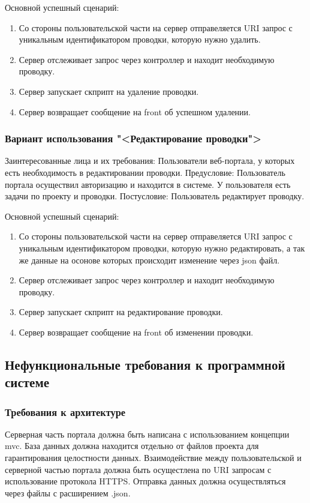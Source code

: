 Основной успешный сценарий:
\begin{enumerate}
	\item Со стороны пользовательской части на сервер отправеляется URI запрос с уникальным идентификатором проводки, которую нужно удалить.
	\item Сервер отслеживает запрос через контроллер и находит необходимую проводку.
	\item Сервер запускает скприпт на удаление проводки.
	\item Сервер возвращает сообщение на front об успешном удалении.
\end{enumerate}

\subsubsection{Вариант использования "<Редактирование проводки">}

Заинтересованные лица и их требования: Пользователи веб-портала, у которых есть необходимость в редактировании проводки.
Предусловие: Пользователь портала осуществил авторизацию и находится в системе. У пользователя есть задачи по проекту и проводки. Постусловие: Пользователь редактирует проводку.

Основной успешный сценарий:
\begin{enumerate}
	\item Со стороны пользовательской части на сервер отправеляется URI запрос с уникальным идентификатором проводки, которую нужно редактировать, а так же данные на осонове которых происходит изменение через json файл.
	\item Сервер отслеживает запрос через контроллер и находит необходимую проводку.
	\item Сервер запускает скприпт на редактирование проводки.
	\item Сервер возвращает сообщение на front об изменении проводки.
\end{enumerate}


\subsection{Нефункциональные требования к программной системе}
\subsubsection{Требования к архитектуре}
Серверная часть портала должна быть написана с использованием концепции mvc. База данных должна находится отдельно от файлов проекта для гарантирования целостности данных. Взаимодействие между пользовательской и серверной частью портала должна быть осущестлена по URI запросам с использование протокола HTTPS. Отправка данных должна осуществляться через файлы с расширением .json.

